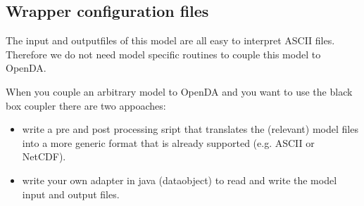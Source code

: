 \subsection{Wrapper configuration files}

The input and outputfiles of this model are all easy to interpret ASCII files. 
Therefore we do not need model specific routines to couple this model to OpenDA.

When you couple an arbitrary model to OpenDA and you want to use the black box coupler there are two appoaches:
\begin{itemize}
	\item write a pre and post processing sript that translates the (relevant)
	      model files into a more generic format that is already supported
	      (e.g. ASCII or NetCDF).
	\item write your own adapter in java (dataobject) to read and write the
	      model input and output files.
\end{itemize}

